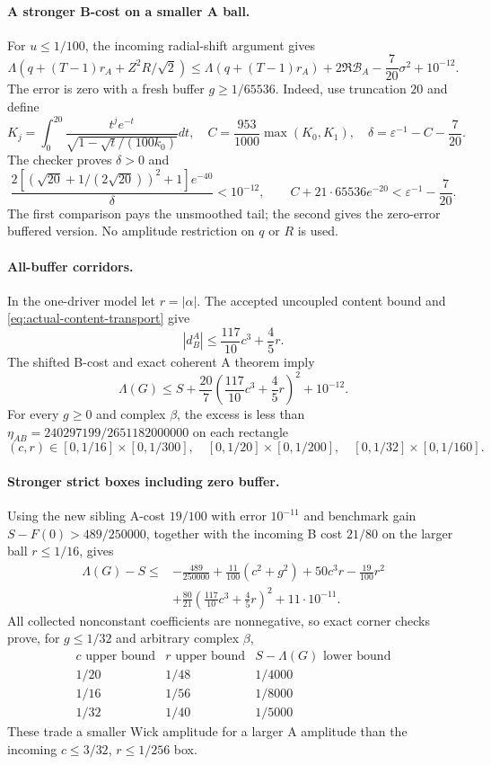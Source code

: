 \paragraph{A stronger B-cost on a smaller A ball.}
For $u\le1/100$, the incoming radial-shift argument gives
\[
 \Lambda(q+(T-1)r_A+Z^2R/\sqrt2)
 \le\Lambda(q+(T-1)r_A)+2\Re\mathcal B_A
       -\frac7{20}\sigma^2+10^{-12}.
\]
The error is zero with a fresh buffer $g\ge1/65536$.
Indeed, use truncation $20$ and define
\[
 K_j=\int_0^{20}\frac{t^je^{-t}}{\sqrt{1-\sqrt t/(100k_0)}}dt,
 \quad C=\frac{953}{1000}\max(K_0,K_1),
 \quad\delta=\varepsilon^{-1}-C-\frac7{20}.
\]
The checker proves $\delta>0$ and
\[
 \frac{2[(\sqrt{20}+1/(2\sqrt{20}))^2+1]e^{-40}}{\delta}
 <10^{-12},\qquad
 C+21\cdot65536e^{-20}<\varepsilon^{-1}-\frac7{20}.
\]
The first comparison pays the unsmoothed tail; the second gives the
zero-error buffered version. No amplitude restriction on $q$ or $R$
is used.

\paragraph{All-buffer corridors.} In the one-driver model let
$r=|\alpha|$. The accepted uncoupled content bound and
\eqref{eq:actual-content-transport} give
\[
 |d_B^A|\le\frac{117}{10}c^3+\frac45r.
\]
The shifted B-cost and exact coherent A theorem imply
\[
 \Lambda(G)\le S+\frac{20}{7}
 \left(\frac{117}{10}c^3+\frac45r\right)^2+10^{-12}.
\]
For every $g\ge0$ and complex $\beta$, the excess is less than
$\eta_{AB}=240297199/2651182000000$ on each rectangle
\[
 (c,r)\in[0,1/16]\times[0,1/300],\quad
 [0,1/20]\times[0,1/200],\quad
 [0,1/32]\times[0,1/160].
\]

\paragraph{Stronger strict boxes including zero buffer.}
Using the new sibling A-cost $19/100$ with error $10^{-11}$ and
benchmark gain $S-F(0)>489/250000$, together with the incoming
B cost $21/80$ on the larger ball $r\le1/16$, gives
\begin{align*}
 \Lambda(G)-S\le{}&-\frac{489}{250000}
 +\frac{11}{100}(c^2+g^2)+50c^3r-\frac{19}{100}r^2\\
 &+\frac{80}{21}\left(\frac{117}{10}c^3+\frac45r\right)^2
 +11\cdot10^{-11}.
\end{align*}
All collected nonconstant coefficients are nonnegative, so exact
corner checks prove, for $g\le1/32$ and arbitrary complex $\beta$,
\[
 \begin{array}{c|c|c}
 c\text{ upper bound}&r\text{ upper bound}&S-\Lambda(G)\text{ lower bound}\\\hline
 1/20&1/48&1/4000\\
 1/16&1/56&1/8000\\
 1/32&1/40&1/5000
 \end{array}
\]
These trade a smaller Wick amplitude for a larger A amplitude than
the incoming $c\le3/32$, $r\le1/256$ box.

